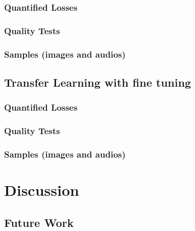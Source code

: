 \documentclass{book}
\begin{document}
\subsection{Quantified Losses}
\subsection{Quality Tests}
\subsection{Samples (images and audios)}
\section{Transfer Learning with fine tuning}
\subsection{Quantified Losses}
\subsection{Quality Tests}
\subsection{Samples (images and audios)}

\chapter{Discussion}
\section{Future Work}
\end{document}
